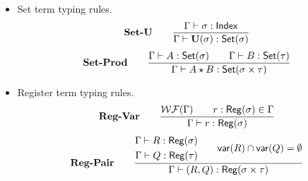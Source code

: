 \begin{itemize}
    \item Set term typing rules.
    \[
        \textbf{Set-U} \qquad
        \frac{\Gamma \vdash \sigma : \mathsf{Index}}{\Gamma \vdash \mathbf{U}(\sigma) : \mathsf{Set}(\sigma)}
    \]
    \[
        \textbf{Set-Prod} \qquad
        \frac{\Gamma \vdash A : \mathsf{Set}(\sigma) \qquad \Gamma \vdash B : \mathsf{Set}(\tau)}{\Gamma \vdash A \star B : \mathsf{Set}(\sigma \times \tau)}
    \]


    \item Register term typing rules.
    \[
        \textbf{Reg-Var} \qquad
        \frac{\mathcal{WF}(\Gamma) \qquad r : \mathsf{Reg}(\sigma) \in \Gamma}{\Gamma \vdash r : \mathsf{Reg}(\sigma)}
    \]
    \[
        \textbf{Reg-Pair}\qquad
        \frac{
            \begin{aligned}
                \Gamma \vdash R : \mathsf{Reg}(\sigma) \\
                \Gamma \vdash Q : \mathsf{Reg}(\tau)
            \end{aligned}
            \qquad \mathsf{var}(R) \cap \mathsf{var}(Q) = \emptyset
        }{\Gamma \vdash (R,Q) : \mathsf{Reg}(\sigma \times \tau)}
    \]


\end{itemize}
